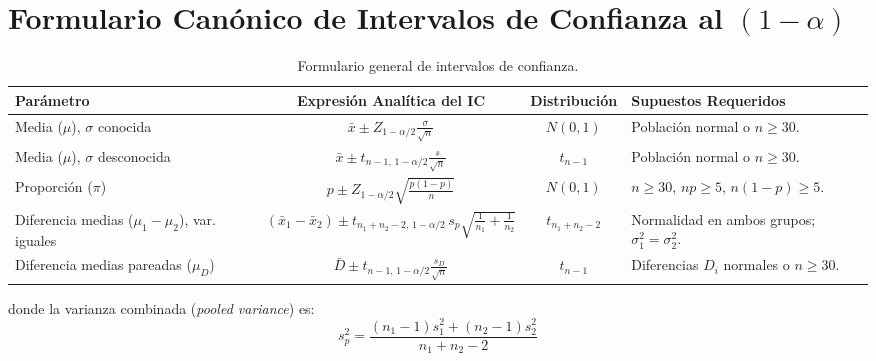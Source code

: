 \documentclass[11pt,a4paper]{report}
\theoremstyle{definition}
\begin{document}
\section{Formulario Canónico de Intervalos de Confianza al $(1-\alpha)$}

\begin{table}[htbp]
\centering
\small
\begin{tabularx}{\textwidth}{l c c X}
\toprule
\textbf{Parámetro} & \textbf{Expresión Analítica del IC} & \textbf{Distribución} & \textbf{Supuestos Requeridos} \\
\midrule
Media ($\mu$), $\sigma$ conocida & $\displaystyle \bar{x} \pm Z_{1-\alpha/2} \frac{\sigma}{\sqrt{n}}$ & $N(0,1)$ & Población normal o $n \ge 30$. \\
\midrule
Media ($\mu$), $\sigma$ desconocida & $\displaystyle \bar{x} \pm t_{n-1, \, 1-\alpha/2} \frac{s}{\sqrt{n}}$ & $t_{n-1}$ & Población normal o $n \ge 30$. \\
\midrule
Proporción ($\pi$) & $\displaystyle p \pm Z_{1-\alpha/2} \sqrt{\frac{p(1-p)}{n}}$ & $N(0,1)$ & $n \ge 30$, $np \ge 5$, $n(1-p) \ge 5$. \\
\midrule
Diferencia medias ($\mu_1 - \mu_2$), var. iguales & $\displaystyle (\bar{x}_1 - \bar{x}_2) \pm t_{n_1+n_2-2, \, 1-\alpha/2} \, s_p \sqrt{\frac{1}{n_1} + \frac{1}{n_2}}$ & $t_{n_1+n_2-2}$ & Normalidad en ambos grupos; $\sigma_1^2 = \sigma_2^2$. \\
\midrule
Diferencia medias pareadas ($\mu_D$) & $\displaystyle \bar{D} \pm t_{n-1, \, 1-\alpha/2} \frac{s_D}{\sqrt{n}}$ & $t_{n-1}$ & Diferencias $D_i$ normales o $n \ge 30$. \\
\bottomrule
\end{tabularx}
\caption{Formulario general de intervalos de confianza.}
\end{table}

donde la varianza combinada (\emph{pooled variance}) es:
\begin{equation}
s_p^2 = \frac{(n_1 - 1)s_1^2 + (n_2 - 1)s_2^2}{n_1 + n_2 - 2}
\end{equation}
\end{document}
